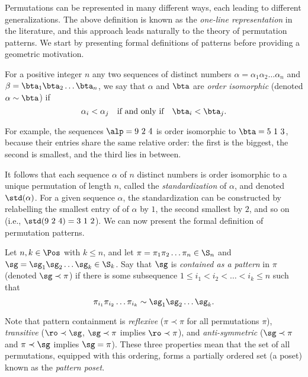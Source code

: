 \documentclass[12pt,twoside]{memoir}
\begin{document}
      Permutations can be represented in many different ways, each leading to
      different generalizations. The above definition is known as the
      \emph{one-line representation} in the literature, and this approach leads
      naturally to the theory of permutation patterns. We start by presenting
      formal definitions of patterns before providing a geometric motivation. 


      \begin{definition} \label{prelim:def:orderiso}
        For a positive integer $n$ any two sequences of distinct numbers $\alpha
        = \alpha_1 \alpha_2 \dots \alpha_n$ and $\beta = \bta_1 \bta_2 \dots
        \bta_n$, we say that $\alpha$ and $\bta$ are \emph{order isomorphic}
        (denoted $\alpha \sim \bta$) if
        $$ \alpha_i < \alpha_j \quad \text{if and only if} 
            \quad \bta_i < \bta_j.$$
      \end{definition}

      For example, the sequences $\alp = 9\ 2\ 4$ is order isomorphic to $\bta  = 5\
      1\ 3$, because their entries share the same relative order: the first is
      the biggest, the second is smallest, and the third lies in between. 

      It follows that each sequence $\alpha$ of $n$ distinct numbers is order
      isomorphic to a unique permutation of length $n$, called the \emph{standardization}
      of $\alpha$, and  denoted $\std(\alpha)$. For a given sequence $\alpha$, the
      standardization can be constructed by relabelling the smallest entry of of
      $\alpha$ by $1$, the second smallest by $2$, and so on (i.e., $\std(9\ 2\
      4) = 3\ 1\ 2$). We can now present the formal definition of permutation
      patterns. 

      \begin{definition} \label{prelim:def:patterns}
        Let $n, k \in \Pos$ with $k \leq n$, and let $\pi = \pi_1 \pi_2 \dots
        \pi_n \in \S_n$ and $\sg = \sg_1 \sg_2 \dots \sg_k \in
        \S_k$. Say that $\sg$ is \emph{contained as a pattern} in $\pi$ (denoted
        $\sg \prec \pi$) if there is some subsequence $1 \leq i_1 < i_2 < \dots
        <i_k \leq n$ such that 
        $$ \pi_{i_1} \pi_{i_2} \dots \pi_{i_k} \sim \sg_1 \sg_2 \dots \sg_k.$$
      \end{definition}


      Note that pattern containment is \emph{reflexive}
      ($\pi \prec \pi$ for all permutations $\pi$), \emph{transitive} ($\ro \prec
      \sg$, $\sg \prec \pi$ implies $\ro \prec \pi$), and \emph{anti-symmetric}
      ($\sg \prec \pi$ and $\pi \prec \sg$ implies $\sg = \pi$). These three
      properties mean that the set of all permutations, equipped with this
      ordering, forms a partially ordered set (a poset) known as the
      \emph{pattern poset}. 
      
\end{document}

